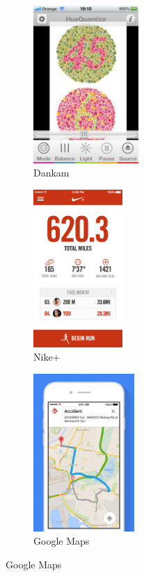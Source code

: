 \begin{figure}[ht]
\centering
\begin{subfigure}{.33\textwidth}
  \centering
  \includegraphics[height=6cm]{images/dankam2}
  \caption{\footnotesize{Dankam}}
  \label{fig:dankam}
\end{subfigure}%
\begin{subfigure}{.33\textwidth}
  \centering
  \includegraphics[height=6cm]{images/nikeplus}
  \caption{\footnotesize{Nike+}}
  \label{fig:nike+}
\end{subfigure}
\begin{subfigure}{.33\textwidth}
  \centering
  \includegraphics[height=6cm]{images/googlemaps}
  \caption{\footnotesize{Google Maps}}
  \label{fig:googlemaps}
\end{subfigure}
\end{figure}

